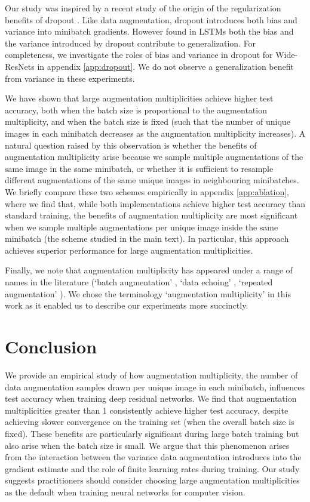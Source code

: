 \documentclass{article}
\begin{document}
Our study was inspired by a recent study of the origin of the regularization benefits of dropout \citep{wei2020implicit}. Like data augmentation, dropout introduces both bias and variance into minibatch gradients. However \citet{wei2020implicit} found in LSTMs both the bias and the variance introduced by dropout contribute to generalization. For completeness, we investigate the roles of bias and variance in dropout for Wide-ResNets in appendix \ref{app:dropout}. We do not observe a generalization benefit from variance in these experiments.

We have shown that large augmentation multiplicities achieve higher test accuracy, both when the batch size is proportional to the augmentation multiplicity, and when the batch size is fixed (such that the number of unique images in each minibatch decreases as the augmentation multiplicity increases).
A natural question raised by this observation is whether the benefits of augmentation multiplicity arise because we sample multiple augmentations of the same image in the same minibatch, or whether it is sufficient to resample different augmentations of the same unique images in neighbouring minibatches. We briefly compare these two schemes empirically in appendix \ref{app:ablation}, where we find that, while both implementations achieve higher test accuracy than standard training, the benefits of augmentation multiplicity are most significant when we sample multiple augmentations per unique image inside the same minibatch (the scheme studied in the main text). In particular, this approach achieves superior performance for large augmentation multiplicities. 

Finally, we note that augmentation multiplicity has appeared under a range of names in the literature (`batch augmentation' \citep{hoffer2019augment}, `data echoing' \citep{choi2019faster}, `repeated augmentation' \citep{berman2019multigrain}). We chose the terminology `augmentation multiplicity' in this work as it enabled us to describe our experiments more succinctly.





\section{Conclusion}

We provide an empirical study of how augmentation multiplicity, the number of data augmentation samples drawn per unique image in each minibatch, influences test accuracy when training deep residual networks. We find that augmentation multiplicities greater than 1 consistently achieve higher test accuracy, despite achieving slower convergence on the training set (when the overall batch size is fixed). These benefits are particularly significant during large batch training but also arise when the batch size is small. We argue that this phenomenon arises from the interaction between the variance data augmentation introduces into the gradient estimate and the role of finite learning rates during training.
Our study suggests practitioners should consider choosing large augmentation multiplicities as the default when training neural networks for computer vision.
\end{document}
